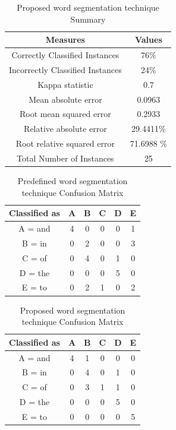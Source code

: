\documentclass[a4paper, 12pt]{article}
\begin{document}
	\begin{table}[H]
		\label{tab:baypropsummery}
		\centering
		\caption{Proposed word segmentation technique Summary}
		\begin{tabular}{ | c | c | }
			\hline
			Measures & Values \\
			\hline\hline
			Correctly Classified Instances & 76\%  \\ 
			Incorrectly Classified Instances & 24\%  \\  
 			Kappa statistic & 0.7 \\   
			Mean absolute error & 0.0963 \\
			Root mean squared error & 0.2933 \\
			Relative absolute error & 29.4411\% \\
			Root relative squared error & 71.6988 \% \\
			Total Number of Instances & 25  \\
			\hline
		\end{tabular}
	\end{table}	
	
	\begin{table}[H]
		\label{tab:bayoldconfusion}
		\centering
		\caption{Predefined word segmentation technique Confusion Matrix}
		\begin{tabular}{ | c | c | c | c | c | c | }
		\hline
		Classified as & A & B & C & D & E \\
		\hline\hline
		A = and & 4 & 0 & 0 & 0 & 1 \\
		B = in & 0 & 2 & 0 & 0 & 3 \\
		C = of & 0 & 4 & 0 & 1 & 0 \\
		D = the & 0 & 0 & 0 & 5 & 0 \\
		E = to  & 0 & 2 & 1 & 0 & 2 \\
		\hline
		\end{tabular}
	\end{table}
	
	\begin{table}[H]
		\label{tab:baypropconfusion}
		\centering
		\caption{Proposed word segmentation technique Confusion Matrix}
		\begin{tabular}{ | c | c | c | c | c | c | }
		\hline
		Classified as & A & B & C & D & E \\
		\hline\hline
		A = and & 4 & 1 & 0 & 0 & 0 \\
		B = in & 0 & 4 & 0 & 1 & 0 \\
		C = of & 0 & 3 & 1 & 1 & 0 \\
		D = the & 0 & 0 & 0 & 5 & 0 \\
		E = to  & 0 & 0 & 0 & 0 & 5 \\
		\hline
		\end{tabular}
	\end{table}
	
\end{document}

